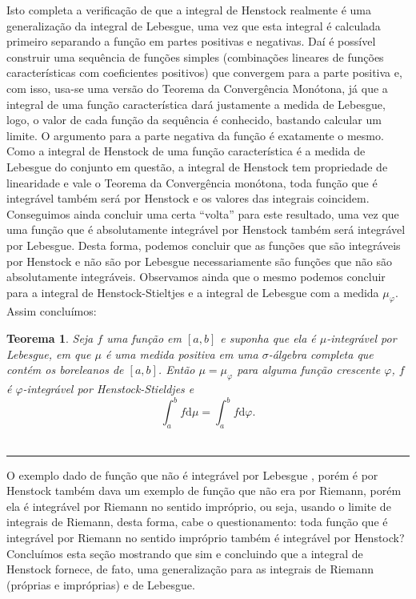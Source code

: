 \documentclass[12pt, a4paper]{article}
\newtheorem{thrm}[mydef]{Teorema}
\def\eop{\hfill\rule{2.5mm}{2.5mm}}
\theoremstyle{definition}
\begin{document}
Isto completa a verificação de que a integral de Henstock realmente é uma generalização da integral de Lebesgue, uma vez que esta integral é calculada primeiro separando a função em partes positivas e negativas. Daí é possível construir uma sequência de funções simples (combinações lineares de funções características com coeficientes positivos) que convergem para a parte positiva e, com isso, usa-se uma versão do Teorema da Convergência Monótona, já que a integral de uma função característica dará justamente a medida de Lebesgue, logo, o valor de cada função da sequência é conhecido, bastando calcular um limite. O argumento para a parte negativa da função é exatamente o mesmo. Como a integral de Henstock de uma função característica é a medida de Lebesgue do conjunto em questão, a integral de Henstock tem propriedade de linearidade e vale o Teorema da Convergência monótona, toda função que é integrável também será por Henstock e os valores das integrais coincidem. Conseguimos ainda concluir uma certa ``volta'' para este resultado, uma vez que uma função que é absolutamente integrável por Henstock também será integrável por Lebesgue. Desta forma, podemos concluir que as funções que são integráveis por Henstock e não são por Lebesgue necessariamente são funções que não são absolutamente integráveis. Observamos ainda que o mesmo podemos concluir para a integral de Henstock-Stieltjes e a integral de Lebesgue com a medida $\mu_\varphi$. Assim concluímos: 

\begin{thrm}
	
	Seja $f$ uma função em $[a,b]$ e suponha que ela é $\mu$-integrável por Lebesgue, em que $\mu$ é uma medida positiva em uma $\sigma$-álgebra completa que contém os boreleanos de $[a,b]$. Então $\mu=\mu_\varphi$ para alguma função crescente $\varphi$, $f$ é $\varphi$-integrável por Henstock-Stieldjes e $$\int_a^b f  \text{d}\mu = \int_a^b f  \text{d}\varphi .$$ \ \eop
	
\end{thrm}

O exemplo dado de função que não é integrável por Lebesgue , porém é por Henstock também dava um exemplo de função que não era por Riemann, porém ela é integrável por Riemann no sentido impróprio, ou seja, usando o limite de integrais de Riemann, desta forma, cabe o questionamento: toda função que é integrável por Riemann no sentido impróprio também é integrável por Henstock? Concluímos esta seção mostrando que sim e concluindo que a integral de Henstock fornece, de fato, uma generalização para as integrais de Riemann (próprias e impróprias) e de Lebesgue. 
\end{document}
